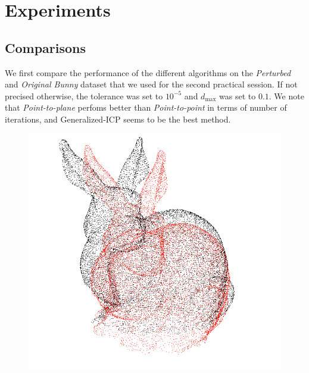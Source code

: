 \documentclass[11pt,letterpaper,leqno]{article}
\begin{document}
\section{Experiments}

\subsection{Comparisons}
We first compare the performance of the different algorithms on the \textit{Perturbed} and \textit{Original Bunny} dataset that we used for the second practical session. If not precised otherwise, the tolerance was set to $10^{-5}$ and $d_{\max}$ was set to $0.1$. We note that \textit{Point-to-plane} perfoms better than \textit{Point-to-point} in terms of number of iterations, and Generalized-ICP seems to be the best method. 
\begin{figure}[ht!]
    \centering
    \begin{minipage}{0.45\linewidth}
    \includegraphics[width=\linewidth]{img/comparison_1_clouds.png}
    \end{minipage}\hfill
    \begin{minipage}{0.45\linewidth}

\end{minipage}
\end{figure}
\end{document}
